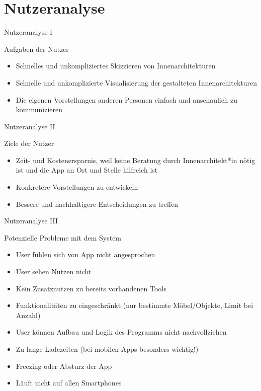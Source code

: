 \documentclass[presentation,bigger,aspectratio=169]{beamer}
\begin{document}
\section{Nutzeranalyse}
\label{sec:org866e077}
\begin{frame}[label={sec:org8418207}]{\vspace{2.2cm}\begin{center}\MakeUppercase{\insertsection}\end{center}}
\end{frame}

\begin{frame}[label={sec:orgc98db61}]{Nutzeranalyse I}
\begin{block}{Aufgaben der Nutzer}
\begin{itemize}
\item Schnelles und unkompliziertes Skizzieren von Innenarchitekturen
\item Schnelle und unkomplizierte Visualisierung der gestalteten Innenarchitekturen
\item Die eigenen Vorstellungen anderen Personen einfach und anschaulich
zu kommunizieren
\end{itemize}
\end{block}
\end{frame}

\begin{frame}[label={sec:org251717d}]{Nutzeranalyse II}
\begin{block}{Ziele der Nutzer}
\begin{itemize}
\item Zeit- und Kostenersparnis, weil keine Beratung durch
Innenarchitekt*in nötig ist und die App an Ort und Stelle hilfreich
ist
\item Konkretere Vorstellungen zu entwickeln
\item Bessere und nachhaltigere Entscheidungen zu treffen
\end{itemize}
\end{block}
\end{frame}

\begin{frame}[label={sec:org9ebc3b1}]{Nutzeranalyse III}
\begin{block}{Potenzielle Probleme mit dem System}
\begin{itemize}
\item User fühlen sich von App nicht angesprochen
\item User sehen Nutzen nicht
\item Kein Zusatznutzen zu bereits vorhandenen Tools
\item Funktionalitäten zu eingeschränkt (nur bestimmte Möbel/Objekte,
Limit bei Anzahl)
\item User können Aufbau und Logik des Programms nicht nachvollziehen
\item Zu lange Ladezeiten (bei mobilen Apps besonders wichtig!)
\item Freezing oder Absturz der App
\item Läuft nicht auf allen Smartphones
\end{itemize}
\end{block}
\end{frame}
\end{document}
